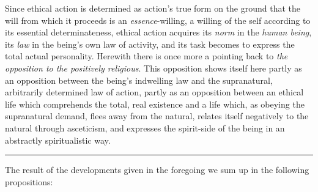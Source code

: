 \documentclass[12pt,a4paper]{book}
\begin{document}
Since ethical action is determined as action's true form on the ground that
the will from which it proceeds is an \emph{essence}-willing, a willing of the
self according to its essential determinateness, ethical action acquires its
\emph{norm} in the \emph{human being}, its \emph{law} in the being's own law
of activity, and its task becomes to express the total actual personality.
Herewith there is once more a pointing back to \emph{the opposition to the
positively religious}. This opposition shows itself here partly as an
opposition between the being's indwelling law and the supranatural,
arbitrarily determined law of action, partly as an opposition between an
ethical life which comprehends the total, real existence and a life which, as
obeying the supranatural demand, flees away from the natural, relates itself
negatively to the natural through asceticism, and expresses the spirit-side of
the being in an abstractly spiritualistic way.

\begin{center}\rule{2cm}{0.4pt}\end{center}

The result of the developments given in the foregoing we sum up in the
following propositions:
\end{document}
